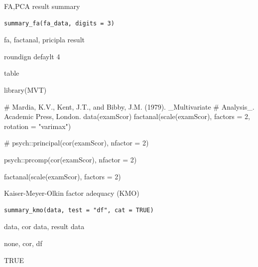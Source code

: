 \documentclass[a4paper]{book}
\begin{document}
%
\begin{Description}
FA,PCA result summary
\end{Description}
%
\begin{Usage}
\begin{verbatim}
summary_fa(fa_data, digits = 3)
\end{verbatim}
\end{Usage}
%
\begin{Arguments}
\begin{ldescription}
\item[\code{fa\_data}] fa, factanal, pricipla result

\item[\code{digits}] roundign defaylt 4
\end{ldescription}
\end{Arguments}
%
\begin{Value}
table
\end{Value}
%
\begin{Examples}
\begin{ExampleCode}

library(MVT)

#  Mardia, K.V., Kent, J.T., and Bibby, J.M. (1979).  _Multivariate
#  Analysis_. Academic Press, London.
data(examScor)
factanal(scale(examScor), factors = 2, rotation = "varimax")%

\#
psych::principal(cor(examScor), nfactor = 2) %

psych::prcomp(cor(examScor), nfactor = 2) %

factanal(scale(examScor), factors = 2) %

\end{ExampleCode}
\end{Examples}
%
\begin{Description}
Kaiser-Meyer-Olkin factor adequacy (KMO)
\end{Description}
%
\begin{Usage}
\begin{verbatim}
summary_kmo(data, test = "df", cat = TRUE)
\end{verbatim}
\end{Usage}
%
\begin{Arguments}
\begin{ldescription}
\item[\code{data}] data, cor data, result data

\item[\code{test}] none, cor, df

\item[\code{cat}] TRUE
\end{ldescription}
\end{Arguments}
\end{document}
